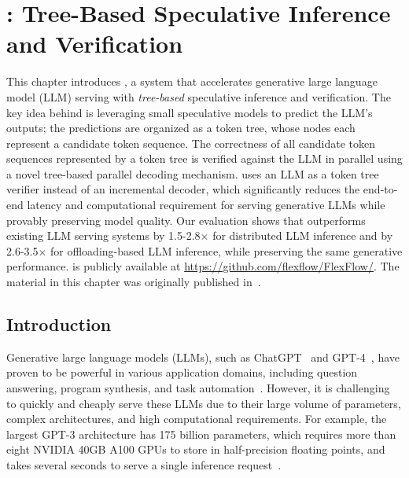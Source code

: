 \chapter{\SpecInfer: Tree-Based Speculative Inference and Verification}
\label{ch:specinfer}

\providecommand{\specinferLineComment}[1]{\State \(\triangleright\) #1}

This chapter introduces \SpecInfer, a system that accelerates generative large language model (LLM) serving with {\em tree-based} speculative inference and verification.
The key idea behind \SpecInfer is leveraging small speculative models to predict the LLM's outputs; the predictions are organized as a token tree, whose nodes each represent a candidate token sequence.
The correctness of all candidate token sequences represented by a token tree is verified against the LLM in parallel using a novel tree-based parallel decoding mechanism.
\SpecInfer uses an LLM as a token tree verifier instead of an incremental decoder, which significantly reduces the end-to-end latency and computational requirement for serving generative LLMs while provably preserving model quality.
Our evaluation shows that \SpecInfer outperforms existing LLM serving systems by 1.5-2.8$\times$ for distributed LLM inference and by 2.6-3.5$\times$ for offloading-based LLM inference, while preserving the same generative performance.
\SpecInfer is publicly available at \url{https://github.com/flexflow/FlexFlow/}.
The material in this chapter was originally published in~\cite{specinfer}.

\section{Introduction}
\label{specinfer:sec:intro}
Generative large language models (LLMs), such as ChatGPT~\cite{brown2020language} and GPT-4~\cite{openai2023gpt4}, have proven to be powerful in various application domains, including question answering, program synthesis, and task automation~\cite{zhang2019pretraining,liu2021makes}.
However, it is challenging to quickly and cheaply serve these LLMs due to their large volume of parameters, complex architectures, and high computational requirements.
For example, the largest GPT-3 architecture has 175 billion parameters, which requires more than eight NVIDIA 40GB A100 GPUs to store in half-precision floating points, and takes several seconds to serve a single inference request~\cite{brown2020language}.

